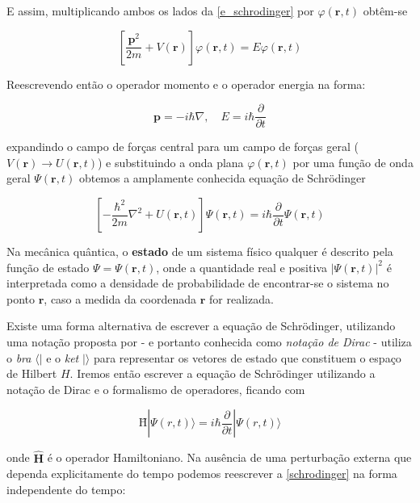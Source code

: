 	E assim, multiplicando ambos os lados da \autoref{e_schrodinger} por $\varphi (\textbf{r}, t)$ obtêm-se
	
	\begin{equation}
		\left[ \frac{\textbf{p}^2}{2m} + V(\textbf{r})\right] \varphi (\textbf{r}, t) = E \varphi (\textbf{r}, t)
	\end{equation}
	
	Reescrevendo então o operador momento e o operador energia na forma:
	 
	\begin{equation}
		\textbf{p} = -i\hbar \nabla, \quad E=i\hbar \frac{\partial}{\partial t}
	\end{equation}
	
	expandindo o campo de forças central para um campo de forças geral ($V(\textbf{r}) \rightarrow U(\textbf{r}, t)$) e substituindo a onda plana $\varphi (\textbf{r}, t)$ por uma função de onda geral $\Psi(\textbf{r}, t)$ obtemos a amplamente conhecida equação de Schrödinger
	
	\begin{equation}
		\left[ -\frac{\hbar^2}{2m}\nabla^2 + U(\textbf{r}, t) \right]\Psi(\textbf{r}, t) = i\hbar \frac{\partial}{\partial t}\Psi(\textbf{r}, t)
	\end{equation}
	
	
	Na mecânica quântica, o \textbf{estado} de um sistema físico qualquer é descrito pela função de estado $\Psi = \Psi(\textbf{r}, t)$, onde a quantidade real e positiva $|\Psi(\textbf{r}, t)|^2$ é interpretada como a densidade de probabilidade de encontrar-se o sistema no ponto $\textbf{r}$, caso a medida da coordenada $\textbf{r}$ for realizada. 
	
	Existe uma forma alternativa de escrever a equação de Schrödinger, utilizando uma notação proposta por \citeauthor{dirac1981principles} - e portanto conhecida como \textit{notação de Dirac} - utiliza o \textit{bra} $\langle |$ e o \textit{ket} $| \rangle$ para representar os vetores de estado que constituem o espaço de Hilbert $\textit{H}$. Iremos então escrever a equação de Schrödinger utilizando a notação de Dirac e o formalismo de operadores, ficando com
	

	\begin{equation}
	\textbf{\^H}|\Psi(r,t)\rangle = i\hbar\frac{\partial}{\partial t} |\Psi(r,t)\rangle
	\label{schrodinger}
	\end{equation}
	
	onde $\hat{\textbf{H}}$ é o operador Hamiltoniano. Na ausência de uma perturbação externa que dependa explicitamente do tempo podemos reescrever a \autoref{schrodinger} na forma independente do tempo:
	
